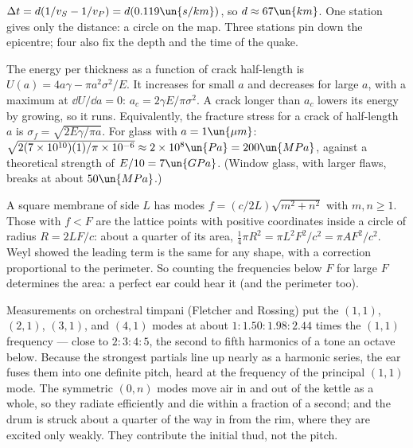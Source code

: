 $\Delta t = d(1/v_S - 1/v_P) = d(0.119\un{s/km})$, so $d\approx67\un{km}$. One station gives only the distance: a circle on the map. Three stations pin down the epicentre; four also fix the depth and the time of the quake.

 The energy per thickness as a function of crack half-length is $U(a) = 4a\gamma - \pi a^2\sigma^2/E$. It increases for small $a$ and decreases for large $a$, with a maximum at $\dd U/\dd a = 0$: $a_c = 2\gamma E/\pi\sigma^2$. A crack longer than $a_c$ lowers its energy by growing, so it runs. Equivalently, the fracture stress for a crack of half-length $a$ is $\sigma_f = \sqrt{2E\gamma/\pi a}$. For glass with $a = 1\un{\mu m}$: $\sqrt{2(7\times10^{10})(1)/\pi\times10^{-6}}\approx2\times10^{8}\un{Pa} = 200\un{MPa}$, against a theoretical strength of $E/10 = 7\un{GPa}$. (Window glass, with larger flaws, breaks at about $50\un{MPa}$.)

 A square membrane of side $L$ has modes $f = (c/2L)\sqrt{m^2+n^2}$ with $m,n\ge1$. Those with $f<F$ are the lattice points with positive coordinates inside a circle of radius $R = 2LF/c$: about a quarter of its area, $\tfrac14\pi R^2 = \pi L^2F^2/c^2 = \pi AF^2/c^2$. Weyl showed the leading term is the same for any shape, with a correction proportional to the perimeter. So counting the frequencies below $F$ for large $F$ determines the area: a perfect ear could hear it (and the perimeter too).

 Measurements on orchestral timpani (Fletcher and Rossing) put the $(1,1)$, $(2,1)$, $(3,1)$, and $(4,1)$ modes at about $1:1.50:1.98:2.44$ times the $(1,1)$ frequency --- close to $2:3:4:5$, the second to fifth harmonics of a tone an octave below. Because the strongest partials line up nearly as a harmonic series, the ear fuses them into one definite pitch, heard at the frequency of the principal $(1,1)$ mode. The symmetric $(0,n)$ modes move air in and out of the kettle as a whole, so they radiate efficiently and die within a fraction of a second; and the drum is struck about a quarter of the way in from the rim, where they are excited only weakly. They contribute the initial thud, not the pitch.
